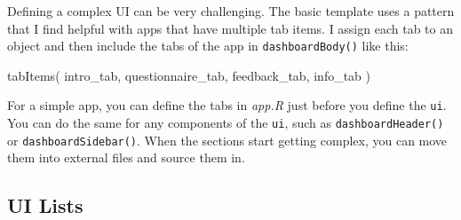 \documentclass[
]{book}
\newenvironment{Shaded}{\begin{snugshade}}{\end{snugshade}}
\newcommand{\FunctionTok}[1]{\textcolor[rgb]{0.00,0.00,0.00}{#1}}
\newcommand{\NormalTok}[1]{#1}
\begin{document}
Defining a complex UI can be very challenging. The basic template uses a pattern that I find helpful with apps that have multiple tab items. I assign each tab to an object and then include the tabs of the app in \texttt{dashboardBody()} like this:

\begin{Shaded}
\begin{Highlighting}[]
\FunctionTok{tabItems}\NormalTok{(}
\NormalTok{    intro\_tab,}
\NormalTok{    questionnaire\_tab,}
\NormalTok{    feedback\_tab,}
\NormalTok{    info\_tab}
\NormalTok{)}
\end{Highlighting}
\end{Shaded}

For a simple app, you can define the tabs in \emph{app.R} just before you define the \texttt{ui}. You can do the same for any components of the \texttt{ui}, such as \texttt{dashboardHeader()} or \texttt{dashboardSidebar()}. When the sections start getting complex, you can move them into external files and source them in.

\hypertarget{ui-lists}{%
\subsection{UI Lists}\label{ui-lists}}
\end{document}
